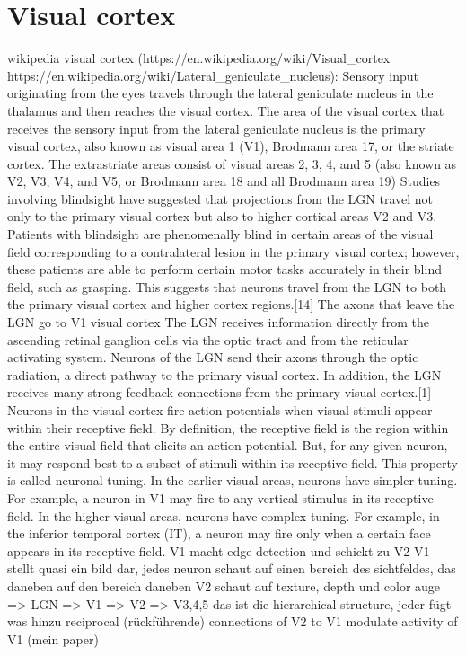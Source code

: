 \section{Visual cortex}

wikipedia visual cortex (https://en.wikipedia.org/wiki/Visual_cortex
https://en.wikipedia.org/wiki/Lateral_geniculate_nucleus):
 Sensory input originating from the eyes travels through the lateral geniculate nucleus in the thalamus and then reaches the visual cortex. The area of the visual cortex that receives the sensory input from the lateral geniculate nucleus is the primary visual cortex, also known as visual area 1 (V1), Brodmann area 17, or the striate cortex. The extrastriate areas consist of visual areas 2, 3, 4, and 5 (also known as V2, V3, V4, and V5, or Brodmann area 18 and all Brodmann area 19)
 Studies involving blindsight have suggested that projections from the LGN travel not only to the primary visual cortex but also to higher cortical areas V2 and V3. Patients with blindsight are phenomenally blind in certain areas of the visual field corresponding to a contralateral lesion in the primary visual cortex; however, these patients are able to perform certain motor tasks accurately in their blind field, such as grasping. This suggests that neurons travel from the LGN to both the primary visual cortex and higher cortex regions.[14]
The axons that leave the LGN go to V1 visual cortex
The LGN receives information directly from the ascending retinal ganglion cells via the optic tract and from the reticular activating system. Neurons of the LGN send their axons through the optic radiation, a direct pathway to the primary visual cortex. In addition, the LGN receives many strong feedback connections from the primary visual cortex.[1]
 Neurons in the visual cortex fire action potentials when visual stimuli appear within their receptive field.
By definition, the receptive field is the region within the entire visual field that elicits an action potential. But, for any given neuron, it may respond best to a subset of stimuli within its receptive field. This property is called neuronal tuning. In the earlier visual areas, neurons have simpler tuning. For example, a neuron in V1 may fire to any vertical stimulus in its receptive field. In the higher visual areas, neurons have complex tuning. For example, in the inferior temporal cortex (IT), a neuron may fire only when a certain face appears in its receptive field.
V1 macht edge detection und schickt zu V2
V1 stellt quasi ein bild dar, jedes neuron schaut auf einen bereich des sichtfeldes, das daneben auf den bereich daneben
V2 schaut auf texture, depth und color
auge => LGN => V1 => V2 => V3,4,5
das ist die hierarchical structure, jeder fügt was hinzu
 reciprocal (rückführende) connections of V2 to V1 modulate activity of V1 (mein paper)

